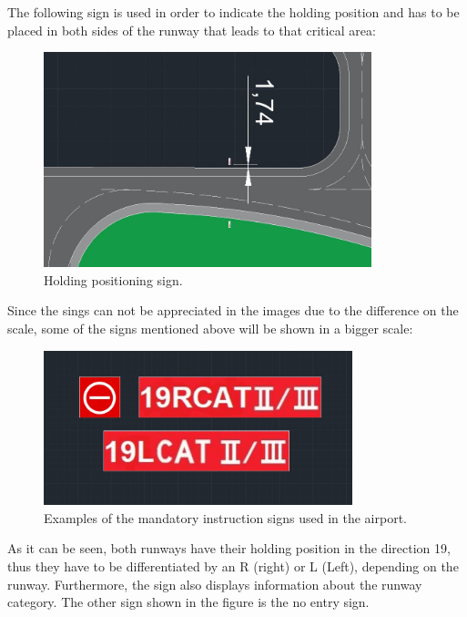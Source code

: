 	The following sign is used in order to indicate the holding position and has to be placed in both sides of the runway that leads to that critical area:
	
	\begin{figure}[H]
		\centering
		\includegraphics[clip, trim=0cm 0cm 0cm 0cm, width=0.85\textwidth]{./images/signsexamples/holdingposition}
		\caption{Holding positioning sign.} %
		\label{} %
	\end{figure}
	
	Since the sings can not be appreciated in the images due to the difference on the scale, some of the signs mentioned above will be shown in a bigger scale:
	
	\begin{figure}[H]
		\centering
		\includegraphics[clip, trim=0cm 0cm 0cm 0cm, width=0.8\textwidth]{./images/signsexamples/examples}
		\caption{Examples of the mandatory instruction signs used in the airport.} %
		\label{} %
	\end{figure}
	
	As it can be seen, both runways have their holding position in the direction 19, thus they have to be differentiated by an R (right) or L (Left), depending on the runway. Furthermore, the sign also displays information about the runway category. The other sign shown in the figure is the no entry sign.
	
